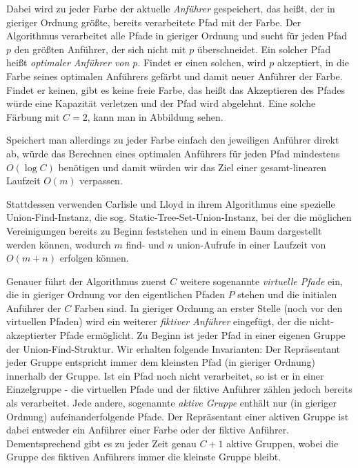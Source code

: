 Dabei wird zu jeder Farbe der aktuelle {\em Anführer} gespeichert, das heißt, der in gieriger Ordnung größte, bereits
verarbeitete Pfad mit der Farbe.
Der Algorithmus verarbeitet alle Pfade in gieriger Ordnung und sucht für jeden Pfad $p$ den größten Anführer, der
sich nicht mit $p$ überschneidet.
Ein solcher Pfad heißt {\em optimaler Anführer von $p$}.
Findet er einen solchen, wird $p$ akzeptiert, in die Farbe seines optimalen Anführers gefärbt und damit neuer Anführer
der Farbe.
Findet er keinen, gibt es keine freie Farbe, das heißt das Akzeptieren des Pfades würde eine Kapazität verletzen und der
Pfad wird abgelehnt.
Eine solche Färbung mit $C = 2$, kann man in Abbildung  sehen.


Speichert man allerdings zu jeder Farbe einfach den jeweiligen Anführer direkt ab, würde das Berechnen eines optimalen
Anführers für jeden Pfad mindestens $O(\log C)$ benötigen und damit würden wir das Ziel einer gesamt-linearen Laufzeit
$O(m)$ verpassen.

Stattdessen verwenden Carlisle und Lloyd in ihrem Algorithmus eine spezielle Union-Find-Instanz, die sog.
Static-Tree-Set-Union-Instanz, bei der die möglichen Vereinigungen bereits zu Beginn feststehen und in einem Baum
dargestellt werden können, wodurch  $m$ find- und $n$ union-Aufrufe in einer Laufzeit von $O(m + n)$ erfolgen können.

Genauer führt der Algorithmus zuerst $C$ weitere sogenannte {\em virtuelle Pfade} ein, die in gieriger Ordnung
vor den eigentlichen Pfaden $P$ stehen und die initialen Anführer der $C$ Farben sind.
In gieriger Ordnung an erster Stelle (noch vor den virtuellen Pfaden) wird ein weiterer {\em fiktiver Anführer}
eingefügt, der die  nicht-akzeptierter Pfade ermöglicht.
Zu Beginn ist jeder Pfad in einer eigenen Gruppe der Union-Find-Struktur.
Wir erhalten folgende Invarianten:
Der Repräsentant jeder Gruppe entspricht immer dem kleinsten Pfad (in gieriger Ordnung) innerhalb der Gruppe.
Ist ein Pfad noch nicht verarbeitet, so ist er in einer Einzelgruppe - die virtuellen Pfade und der fiktive Anführer
zählen jedoch bereits als verarbeitet.
Jede andere, sogenannte {\em aktive Gruppe} enthält nur (in gieriger Ordnung) aufeinanderfolgende Pfade.
Der Repräsentant einer aktiven Gruppe ist dabei entweder ein Anführer einer Farbe oder der fiktive Anführer.
Dementsprechend gibt es zu jeder Zeit genau $C+1$ aktive Gruppen, wobei die Gruppe des fiktiven
Anführers immer die kleinste Gruppe bleibt.

